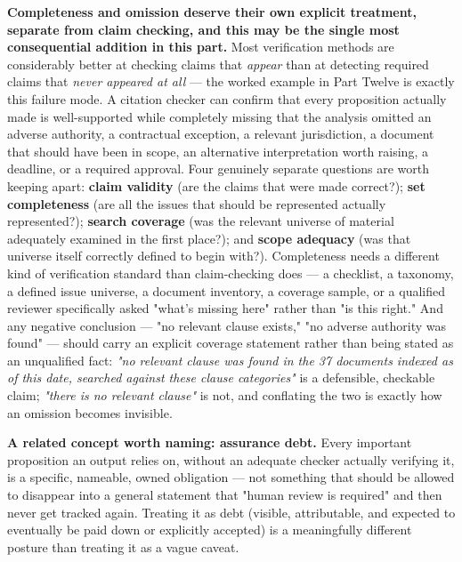 \textbf{Completeness and omission deserve their own explicit treatment, separate from claim checking, and this may be the single most consequential addition in this part.} Most verification methods are considerably better at checking claims that \emph{appear} than at detecting required claims that \emph{never appeared at all} --- the worked example in Part Twelve is exactly this failure mode. A citation checker can confirm that every proposition actually made is well-supported while completely missing that the analysis omitted an adverse authority, a contractual exception, a relevant jurisdiction, a document that should have been in scope, an alternative interpretation worth raising, a deadline, or a required approval. Four genuinely separate questions are worth keeping apart: \textbf{claim validity} (are the claims that were made correct?); \textbf{set completeness} (are all the issues that should be represented actually represented?); \textbf{search coverage} (was the relevant universe of material adequately examined in the first place?); and \textbf{scope adequacy} (was that universe itself correctly defined to begin with?). Completeness needs a different kind of verification standard than claim-checking does --- a checklist, a taxonomy, a defined issue universe, a document inventory, a coverage sample, or a qualified reviewer specifically asked "what's missing here" rather than "is this right." And any negative conclusion --- "no relevant clause exists," "no adverse authority was found" --- should carry an explicit coverage statement rather than being stated as an unqualified fact: \emph{"no relevant clause was found in the 37 documents indexed as of this date, searched against these clause categories"} is a defensible, checkable claim; \emph{"there is no relevant clause"} is not, and conflating the two is exactly how an omission becomes invisible.

\textbf{A related concept worth naming: assurance debt.} Every important proposition an output relies on, without an adequate checker actually verifying it, is a specific, nameable, owned obligation --- not something that should be allowed to disappear into a general statement that "human review is required" and then never get tracked again. Treating it as debt (visible, attributable, and expected to eventually be paid down or explicitly accepted) is a meaningfully different posture than treating it as a vague caveat.

